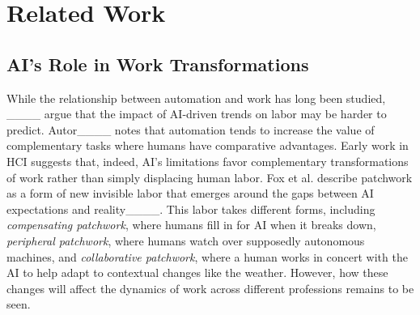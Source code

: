\section{Related Work}
\subsection{AI's Role in Work Transformations}

While the relationship between automation and work has long been studied,
____ argue that the impact of AI-driven trends on labor may be harder to predict.
Autor____ notes that automation tends to increase the value of complementary tasks where humans have comparative advantages.
Early work in HCI suggests that, indeed, AI's limitations favor complementary transformations of work rather than simply displacing human labor. Fox et al. describe patchwork as a form of new invisible labor that emerges around the gaps between AI expectations and reality____. This labor takes different forms, including \textit{compensating patchwork}, where humans fill in for AI when it breaks down, \textit{peripheral patchwork}, where humans watch over supposedly autonomous machines, and \textit{collaborative patchwork}, where a human works in concert with the AI to help adapt to contextual changes like the weather. However, how these changes will affect the dynamics of work across different professions remains to be seen.


